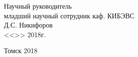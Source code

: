 \begin{titlepage}
\vfill

\begin{flushright}
\begin{minipage}{0.45\textwidth}
 \begin{flushleft}
Научный руководитель\\
младший научный сотрудник каф. КИБЭВС\\
\underline{\hspace{3cm}} Д.С. Никифоров\\
<<\underline{\hspace{1cm}}>>\underline{\hspace{3cm}} 2018г.\\
 \end{flushleft}
\end{minipage}
\end{flushright}

\vfill

\centerline{Томск 2018}
\end{titlepage}
\clearpage